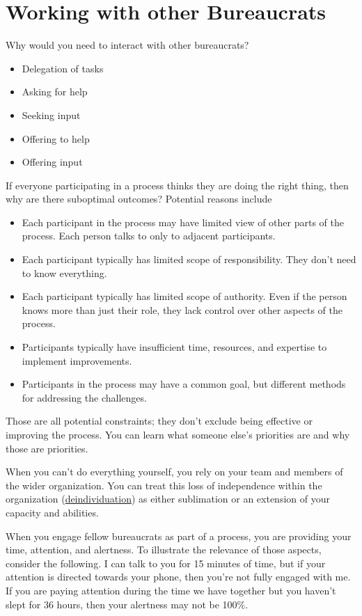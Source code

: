 \chapter{Working with other Bureaucrats\label{sec:working-with-other-bureaucrats}}

Why would you need to interact with other bureaucrats?
\begin{itemize}
    \item Delegation of tasks
    \item Asking for help
    \item Seeking input
    \item Offering to help
    \item Offering input
\end{itemize}


If everyone participating in a process thinks they are doing the right thing, then why are there suboptimal outcomes? Potential reasons include
\begin{itemize}
    \item Each participant in the process may have limited view of other parts of the process. Each person talks to only to adjacent participants.
    \item Each participant typically has limited scope of responsibility. They don't need to know everything. 
    \item Each participant typically has limited scope of authority. Even if the person knows more than just their role, they lack control over other aspects of the process.
    \item Participants typically have insufficient time, resources, and expertise to implement improvements.
    \item Participants in the process may have a common goal, but different methods for addressing the challenges.
\end{itemize}
Those are all potential constraints; they don't exclude being effective or improving the process. 
You can learn what someone else's priorities are and why those are priorities.


When you can't do everything yourself, you rely on your team and members of the wider organization. You can treat this loss of independence within the organization (\href{https://en.wikipedia.org/wiki/Deindividuation}{deindividuation}) as either sublimation or an extension of your capacity and abilities.


When you engage fellow bureaucrats as part of a process, you are providing your time, attention, and alertness. To illustrate the relevance of those aspects, consider the following. I can talk to you for 15 minutes of time, but if your attention is directed towards your phone, then you're not fully engaged with me. If you are paying attention during the time we have together but you haven't slept for 36 hours, then your alertness may not be 100\%. 

